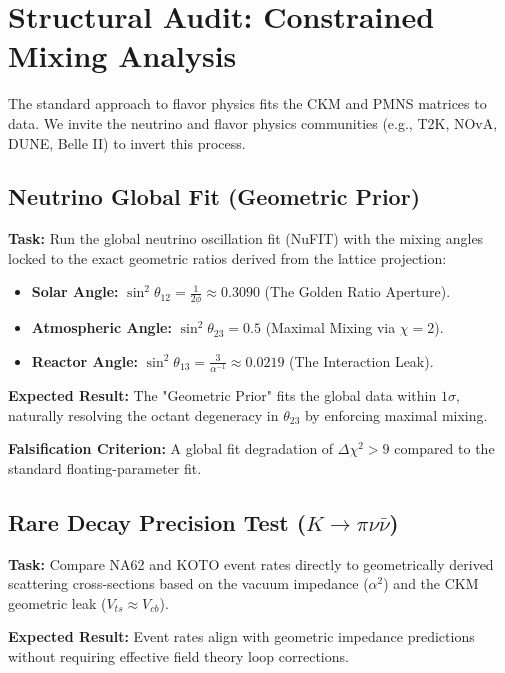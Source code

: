 \section{Structural Audit: Constrained Mixing Analysis}

The standard approach to flavor physics fits the CKM and PMNS matrices to data. We invite the neutrino and flavor physics communities (e.g., T2K, NOvA, DUNE, Belle II) to invert this process.

\subsection{Neutrino Global Fit (Geometric Prior)}

\textbf{Task:} Run the global neutrino oscillation fit (NuFIT) with the mixing angles locked to the exact geometric ratios derived from the lattice projection:
\begin{itemize}
    \item \textbf{Solar Angle:} $\sin^2 \theta_{12} = \frac{1}{2\phi} \approx 0.3090$ (The Golden Ratio Aperture).
    \item \textbf{Atmospheric Angle:} $\sin^2 \theta_{23} = 0.5$ (Maximal Mixing via $\chi=2$).
    \item \textbf{Reactor Angle:} $\sin^2 \theta_{13} = \frac{3}{\alpha^{-1}} \approx 0.0219$ (The Interaction Leak).
\end{itemize}

\textbf{Expected Result:} The "Geometric Prior" fits the global data within $1\sigma$, naturally resolving the octant degeneracy in $\theta_{23}$ by enforcing maximal mixing.

\textbf{Falsification Criterion:} A global fit degradation of $\Delta\chi^2 > 9$ compared to the standard floating-parameter fit.

\subsection{Rare Decay Precision Test (\texorpdfstring{$K \to \pi\nu\bar{\nu}$}{Ktopinubar})}

\textbf{Task:} Compare NA62 and KOTO event rates directly to geometrically derived scattering cross-sections based on the vacuum impedance ($\alpha^2$) and the CKM geometric leak ($V_{ts} \approx V_{cb}$).

\textbf{Expected Result:} Event rates align with geometric impedance predictions without requiring effective field theory loop corrections.
